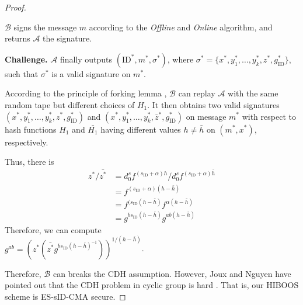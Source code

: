 \documentclass[times]{secauth}
\theoremstyle{definition}
\theoremstyle{remark}
\begin{document}
\begin{proof}
\begin{itemize}
	$\mathcal{B}$ signs the message $m$ according to the \emph{Offline} and \emph{Online} algorithm, and returns $\mathcal{A}$ the signature.
\end{itemize}
\textbf{Challenge.} 
$\mathcal{A}$ finally outputs $(\mathrm{ID}^*, m^*, \sigma^*)$, where $ \sigma^*=\{x^*, y^*_1, \ldots, y^*_k, z^*, g_\mathrm{ID}^*\}$, such that $\sigma^*$ is a valid signature on $m^*$.
\par
According to the principle of forking lemma \cite{Pointcheval1996security}, $\mathcal{B}$ can replay $\mathcal{A}$ with the same random tape but different choices of $H_1$.
It then obtains two valid signatures $(x^*, y_1^*, \ldots, y_k^*, z^*, g_\mathrm{ID}^*)$ and $(x^*, y^*_1, \ldots, y^*_k, \bar{z}^*, g_\mathrm{ID}^*)$ on message $m^*$ with respect to hash functions $H_1$ and $\bar{H_1}$ having different values $h \neq \bar{h}$ on $(m^*, x^*)$, respectively. 
\par



Thus, there is 
\begin{align*}
z^*/\bar{z^*} &= d_0^sf^{(s_\mathrm{ID}+\alpha)h}/d_0^sf^{(s_\mathrm{ID}+\alpha)\bar{h}}\\
&= f^{(s_\mathrm{ID}+\alpha)(h-\bar{h})}\\
&= f^{(s_\mathrm{ID}(h-\bar{h})}f^{\alpha(h-\bar{h})}\\
&= g^{bs_\mathrm{ID}(h-\bar{h})}g^{ab(h-\bar{h})}
\end{align*}
Therefore, we can compute\\
$g^{ab}=\left(z^*\left(\bar{z^*}g^{bs_\mathrm{ID}(h-\bar{h})^{-1}}\right)\right)^{1/(h-\bar{h})}$.
\par
Therefore, $\mathcal{B}$ can breaks the CDH assumption.
However, Joux and Nguyen have pointed out that the CDH problem in cyclic group is hard \cite{joux2003separating}. 
That is, our HIBOOS scheme is ES-sID-CMA secure.
\end{proof}
\end{document}
